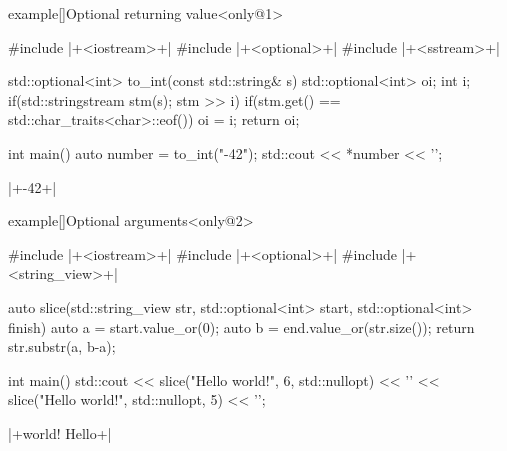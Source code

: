 \begin{frame}[fragile]{}
    \begin{varblock}{example}[\textwidth]{Optional returning value}<only@1>
        \begin{Cpp}
            #include |+<iostream>+|
            #include |+<optional>+|
            #include |+<sstream>+|

            std::optional<int> to_int(const std::string& s) {
                std::optional<int> oi{};
                int i;
                if(std::stringstream stm(s); stm >> i)
                    if(stm.get() == std::char_traits<char>::eof())
                        oi = i;
                return oi;
            }

            int main()
            {
                auto number = to_int("-42");
                std::cout << *number << '\n';
            }
        \end{Cpp}
        \begin{Bash}[numbers=none]
            |+-42+|
        \end{Bash}
    \end{varblock}
    \begin{varblock}{example}[\textwidth]{Optional arguments}<only@2>
        \begin{Cpp}
            #include |+<iostream>+|
            #include |+<optional>+|
            #include |+<string_view>+|

            auto slice(std::string_view str,
                       std::optional<int> start,
                       std::optional<int> finish)
            {
                auto a = start.value_or(0);
                auto b = end.value_or(str.size());
                return str.substr(a, b-a);
            }

            int main()
            {
                std::cout
                    << slice("Hello world!", 6, std::nullopt) << '\n'
                    << slice("Hello world!", std::nullopt, 5) << '\n';
            }
        \end{Cpp}
        \begin{Bash}[numbers=none]
            |+world!
            Hello+|
        \end{Bash}
    \end{varblock}
\end{frame}

